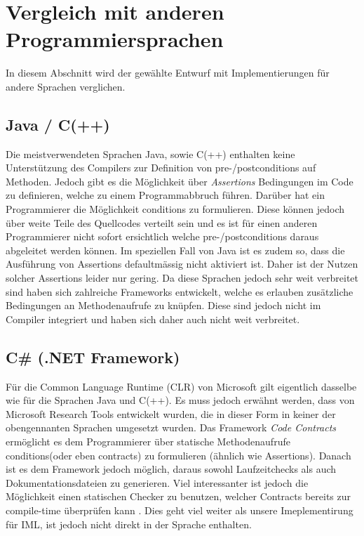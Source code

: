 \section{Vergleich mit anderen Programmiersprachen}
In diesem Abschnitt wird der gewählte Entwurf mit Implementierungen
für andere Sprachen verglichen.

\subsection{Java / C(++)}
Die meistverwendeten Sprachen Java, sowie C(++) enthalten keine Unterstützung des Compilers 
zur Definition von pre-/postconditions auf Methoden. Jedoch gibt es die Möglichkeit 
über \textit{Assertions} Bedingungen im Code zu definieren, welche zu einem Programmabbruch führen.
Darüber hat ein Programmierer die Möglichkeit conditions zu formulieren. Diese können jedoch über weite
Teile des Quellcodes verteilt sein und es ist für einen anderen Programmierer nicht 
sofort ersichtlich welche pre-/postconditions daraus abgeleitet werden können. Im speziellen 
Fall von Java ist es zudem so, dass die Ausführung von Assertions defaultmässig nicht aktiviert 
ist. Daher ist der Nutzen solcher Assertions leider nur gering. Da diese Sprachen jedoch 
sehr weit verbreitet sind haben sich zahlreiche Frameworks entwickelt, welche es erlauben
zusätzliche Bedingungen an Methodenaufrufe zu knüpfen. Diese sind jedoch nicht im Compiler integriert
und haben sich daher auch nicht weit verbreitet.

\subsection{C\# (.NET Framework)}

Für die Common Language Runtime (CLR) von Microsoft gilt eigentlich dasselbe wie für die Sprachen 
Java und C(++). Es muss jedoch erwähnt werden, dass von Microsoft Research Tools entwickelt wurden, 
die in dieser Form in keiner der obengennanten Sprachen umgesetzt wurden. Das Framework 
\textit{Code Contracts} ermöglicht es dem Programmierer über statische Methodenaufrufe 
conditions(oder eben contracts) zu formulieren (ähnlich wie Assertions). 
Danach ist es dem Framework jedoch möglich, daraus sowohl Laufzeitchecks als auch 
Dokumentationsdateien zu generieren. Viel interessanter ist jedoch die Möglichkeit einen 
statischen Checker zu benutzen, welcher Contracts bereits zur compile-time überprüfen 
kann \cite{MS:StaticAnalysis}. Dies geht viel weiter als unsere Imeplementirung für IML, 
ist jedoch nicht direkt in der Sprache enthalten.

